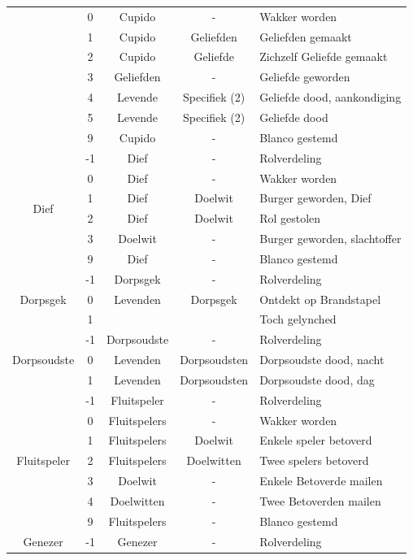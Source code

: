 \documentclass[12pt]{article}
\begin{document}
\begin{center}
\begin{longtable}{c|c|c|c|l}
       & 0 & Cupido & - & Wakker worden \\
       & 1 & Cupido & Geliefden & Geliefden gemaakt \\
       & 2 & Cupido & Geliefde & Zichzelf Geliefde gemaakt \\
       & 3 & Geliefden & - & Geliefde geworden \\
       & 4 & Levende & Specifiek (2) & Geliefde dood, aankondiging \\
       & 5 & Levende & Specifiek (2) & Geliefde dood \\
       & 9 & Cupido & - & Blanco gestemd \\
      \hline
      \multirow{6}{*}{Dief} & -1 & Dief & - & Rolverdeling \\
       & 0 & Dief & - & Wakker worden \\
       & 1 & Dief & Doelwit & Burger geworden, Dief \\
       & 2 & Dief & Doelwit & Rol gestolen \\
       & 3 & Doelwit & - & Burger geworden, slachtoffer \\
       & 9 & Dief & - & Blanco gestemd \\
      \hline
      \multirow{3}{*}{Dorpsgek} & -1 & Dorpsgek & - & Rolverdeling \\
       & 0 & Levenden & Dorpsgek & Ontdekt op Brandstapel \\
       & 1 & & & Toch gelynched \\
      \hline
      \multirow{3}{*}{Dorpsoudste} & -1 & Dorpsoudste & - & Rolverdeling \\
       & 0 & Levenden & Dorpsoudsten & Dorpsoudste dood, nacht \\
       & 1 & Levenden & Dorpsoudsten & Dorpsoudste dood, dag \\
      \hline
      \multirow{7}{*}{Fluitspeler} & -1 & Fluitspeler & - & Rolverdeling \\
       & 0 & Fluitspelers & - & Wakker worden \\
       & 1 & Fluitspelers & Doelwit & Enkele speler betoverd \\
       & 2 & Fluitspelers & Doelwitten & Twee spelers betoverd \\
       & 3 & Doelwit & - & Enkele Betoverde mailen \\
       & 4 & Doelwitten & - & Twee Betoverden mailen \\
       & 9 & Fluitspelers & - & Blanco gestemd \\
      \hline
      \multirow{4}{*}{Genezer} & -1 & Genezer & - & Rolverdeling \\

\end{longtable}
\end{center}
\end{document}
